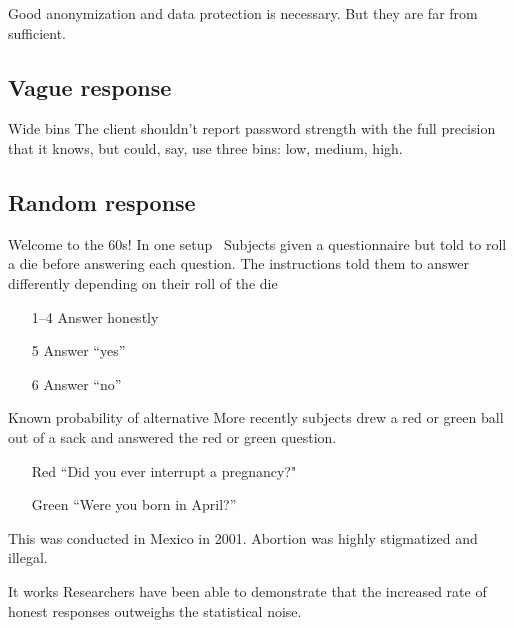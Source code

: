 \documentclass[xcolor={dvipsnames,table,hyperref}]{beamer}
\begin{document}
\begin{frame}[standout]
  Good anonymization and data protection is necessary. But they are far from sufficient.
\end{frame}

\subsection{Vague response}

\begin{frame}{Wide bins}
  The client shouldn't report password strength with the full precision that it knows,
  but could, say, use three bins: low, medium, high.
\end{frame}

\subsection{Random response}

\begin{frame}{Welcome to the 60s!}
  In one setup~\cite{BBB:JoP79} Subjects given a questionnaire but told to roll a die before answering each question.
  The instructions told them to answer differently depending on their roll of the die
  \begin{itemize}
    \item[1--4] Answer honestly
    \item[5] Answer “yes”
    \item[6] Answer “no”
  \end{itemize}
\end{frame}

\begin{frame}{Known probability of alternative}
  More recently subjects drew a red or green ball out of a sack and answered the red or green question. \cite{LaraETAL06:RRT}
  \begin{itemize}
    \item[Red] “Did you ever interrupt a pregnancy?"
    \item[Green] “Were you born in April?”
  \end{itemize}
  This was conducted in Mexico in 2001. Abortion was highly stigmatized and illegal.
\end{frame}

\begin{frame}{It works}
  Researchers have been able to demonstrate that the increased rate of honest responses outweighs the statistical noise.
\end{frame}
\end{document}
